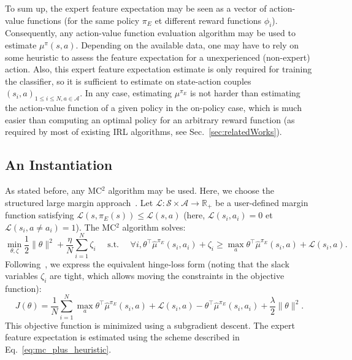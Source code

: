 \documentclass[english,utf8]{./hermes-journal}
\newcommand{\s}{\mathcal{S}}
\newcommand{\A}{\mathcal{A}}
\newcommand{\lc}{\mathcal{L}}
\begin{document}
To sum up, the expert feature expectation may be seen as a vector of
action-value functions (for the same policy $\pi_E$ et different
reward functions $\phi_i$). Consequently, any action-value function
evaluation algorithm may be used to estimate $\mu^\pi(s,a)$.
Depending on the available data, one may have to rely on some
heuristic to assess the feature expectation for a unexperienced
(non-expert) action. Also, this expert feature expectation estimate
is only required for training the classifier, so it is sufficient to
estimate on state-action couples $(s_i,a)_{1\leq i \leq N,a\in \A}$.
In any case, estimating $\mu^{\pi_E}$ is not harder than estimating
the action-value function of a given policy in the on-policy case,
which is much easier than computing an optimal policy for an
arbitrary reward function (as required by most of existing IRL
algorithms, see Sec.~\ref{sec:relatedWorks}).


\subsection{An Instantiation}
\label{subsec:practicalApproach:instantiation}

As stated before, any MC$^2$ algorithm may be used. Here, we choose
the structured large margin approach~\cite{Taskar:2005}. Let
$\lc:\s\times\A\rightarrow\mathbb{R}_+$ be a user-defined margin
function satisfying $\lc(s,\pi_E(s))\leq \lc(s,a)$ (here,
$\lc(s_i,a_i)=0$ et $\lc(s_i,a\neq a_i)=1$). The MC$^2$ algorithm
solves:%
\begin{equation}
  \min_{\theta,\zeta}\frac{1}{2}\|\theta\|^2 +
  \frac{\eta}{N}\sum_{i=1}^N \zeta_i \text{~~~~s.t.~~~~} \forall i,
  \theta^\top\hat{\mu}^{\pi_E}(s_i,a_i)+\zeta_i \geq \max_a \theta^\top
  \hat{\mu}^{\pi_E}(s_i,a) + \lc(s_i,a). \label{eq:qp_taskar}
\end{equation}
Following~\cite{Ratliff:2006}, we express the equivalent hinge-loss
form (noting that the slack variables $\zeta_i$ are tight, which
allows moving the constraints in the objective function):
\begin{equation}
  J(\theta) = \frac{1}{N}\sum_{i=1}^N \max_a \theta^\top
  \hat{\mu}^{\pi_E}(s_i,a) + \lc(s_i,a) -
  \theta^\top\hat{\mu}^{\pi_E}(s_i,a_i) +
  \frac{\lambda}{2}\|\theta\|^2.
\end{equation}
This objective function is minimized using a subgradient descent.
The expert feature expectation is estimated using the scheme
described in Eq.~\eqref{eq:mc_plus_heuristic}.
\end{document}
